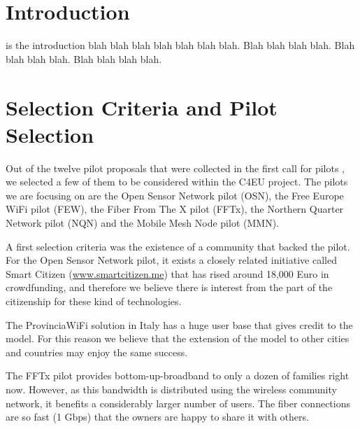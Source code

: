 \documentclass[draftclsnofoot,12pt,journal,onecolumn]{IEEEtran}
\begin{document}
\section{Introduction}
% 
% 
% 
% 
 is the introduction blah blah blah blah blah blah blah.
Blah blah blah blah.
Blah blah blah blah.
Blah blah blah blah.

\section{Selection Criteria and Pilot Selection}

Out of the twelve pilot proposals that were collected in the first call for pilots \cite{barcelo2012bub}, we selected a few of them to be considered within the C4EU project.
The pilots we are focusing on are the Open Sensor Network pilot (OSN), the Free Europe WiFi pilot (FEW), the Fiber From The X pilot (FFTx), the Northern Quarter Network pilot (NQN) and the Mobile Mesh Node pilot (MMN).

A first selection criteria was the existence of a community that backed the pilot.
For the Open Sensor Network pilot, it exists a closely related initiative called Smart Citizen (\url{www.smartcitizen.me}) that has rised around 18,000 Euro in crowdfunding, and therefore we believe there is interest from the part of the citizenship for these kind of technologies.

The ProvinciaWiFi solution in Italy has a huge user base that gives credit to the model.
For this reason we believe that the extension of the model to other cities and countries may enjoy the same success.

The FFTx pilot provides bottom-up-broadband to only a dozen of families right now.
However, as this bandwidth is distributed using the wireless community network, it benefits a considerably larger number of users.
The fiber connections are so fast (1 Gbps) that the owners are happy to share it with others.
\end{document}
